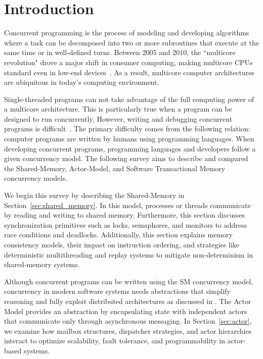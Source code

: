 \section{Introduction\label{sec:introduction}}
Concurrent programming is the process of modeling and
developing algorithms where a task can be decomposed into
two or more subroutines that execute at the same time or in well-defined turns.
Between 2005 and 2010, the ``multicore revolution" drove a major shift in consumer computing,
making multicore CPUs standard even in low-end devices~\cite{alseqyani2023history}.
As a result, multicore computer architectures are ubiquitous in today’s computing environment.

Single-threaded programs can not take advantage of the full computing power of a multicore architecture.
This is particularly true when a program can be designed to run concurrently.
However, writing and debugging concurrent programs is difficult~\cite{huang2016debuggingConcurrentPrograms}.
The primary difficulty comes from the following relation: computer programs
are written by humans using programming languages. 
When developing concurrent programs, programming languages and developers
follow a given concurrency model. The following survey aims to describe
and compared the Shared-Memory, Actor-Model, and Software Transactional Memory
concurrency models.

We begin this survey by describing the Shared-Memory
in Section~\ref{sec:shared_memory}.
In this model, processes or threads communicate by reading and writing
to shared memory.
Furthermore, this section discusses 
synchronization primitives such as locks, semaphores,
and monitors to address race conditions and deadlocks.
Additionally, this section explains memory consistency models,
their impact on instruction ordering,
and strategies like deterministic multithreading
and replay systems to mitigate
non-determinism in shared-memory systems.

Although concurrent programs can be written using the SM concurrency
model, concurrency in modern software systems needs abstractions
that simplify reasoning and fully exploit distributed
architectures as discussed in \cite{10.1145/357980.358021}.
The Actor Model provides an abstraction by encapsulating state
with independent actors that communicate only through
asynchronous messaging. In Section~\ref{sec:actor},
we examine how mailbox structures, dispatcher strategies,
and actor hierarchies interact to optimize scalability, fault tolerance,
and programmability in actor-based systems.

